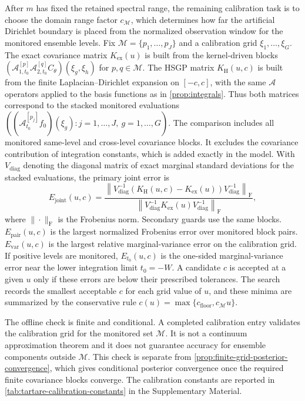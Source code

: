 \documentclass[11pt,a4paper]{article}
\theoremstyle{definition}
\theoremstyle{remark}
\begin{document}
After \(m\) has fixed the retained spectral range, the remaining calibration task is to choose the domain range factor \(c_{\mathcal M}\), which determines how far the artificial Dirichlet boundary is placed from the normalized observation window for the monitored ensemble levels. Fix \(\mathcal M=\{p_1,\ldots,p_J\}\) and a calibration grid \(\xi_1,\ldots,\xi_G\). The exact covariance matrix \(K_{\mathrm{ex}}(u)\) is built from the kernel-driven blocks $\left(\mathcal A_{1,t_0}^{[p]}\mathcal A_{2,t_0}^{[q]}C_\theta\right)(\xi_g,\xi_h)$ for $p,q\in\mathcal M$.
The HSGP matrix \(K_{\mathrm H}(u,c)\) is built from the finite Laplacian--Dirichlet expansion on \([-c,c]\), with the same \(\mathcal A\) operators applied to the basis functions as in \cref{prop:integrals}. Thus both matrices correspond to the stacked monitored evaluations $\left((\mathcal A_{t_0}^{[p_j]}f_0)(\xi_g):j=1,\ldots,J,\ g=1,\ldots,G\right)$.
The comparison includes all monitored same-level and cross-level covariance blocks. It excludes the covariance contribution of integration constants, which is added exactly in the model. With \(V_{\mathrm{diag}}\) denoting the diagonal matrix of exact marginal standard deviations for the stacked evaluations, the primary joint error is
\[
E_{\mathrm{joint}}(u,c)
=
\frac{
\left\|V_{\mathrm{diag}}^{-1}\left(K_{\mathrm{H}}(u,c)-K_{\mathrm{ex}}(u)\right)V_{\mathrm{diag}}^{-1}\right\|_{\mathrm F}
}{
\left\|V_{\mathrm{diag}}^{-1}K_{\mathrm{ex}}(u)V_{\mathrm{diag}}^{-1}\right\|_{\mathrm F}
},
\]
where \(\|\cdot\|_{\mathrm F}\) is the Frobenius norm. Secondary guards use the same blocks. \(E_{\mathrm{pair}}(u,c)\) is the largest normalized Frobenius error over monitored block pairs. \(E_{\mathrm{var}}(u,c)\) is the largest relative marginal-variance error on the calibration grid. If positive levels are monitored, \(E_{t_0}(u,c)\) is the one-sided marginal-variance error near the lower integration limit \(t_0=-W\). A candidate \(c\) is accepted at a given \(u\) only if these errors are below their prescribed tolerances. The search records the smallest acceptable \(c\) for each grid value of \(u\), and these minima are summarized by the conservative rule \(c(u)=\max\{c_{\mathrm{floor}},c_{\mathcal M}u\}\).

The offline check is finite and conditional. A completed calibration entry validates the calibration grid for the monitored set \(\mathcal M\). It is not a continuum approximation theorem and it does not guarantee accuracy for ensemble components outside \(\mathcal M\). This check is separate from \cref{prop:finite-grid-posterior-convergence}, which gives conditional posterior convergence once the required finite covariance blocks converge. The calibration constants are reported in \cref{tab:tartare-calibration-constants} in the Supplementary Material.
\end{document}
